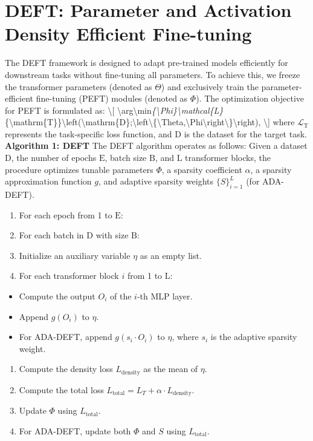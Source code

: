 \documentclass[11pt,a4paper]{article}
\begin{document}
\section{DEFT: Parameter and Activation Density Efficient Fine-tuning}

The DEFT framework is designed to adapt pre-trained models efficiently for downstream tasks without fine-tuning all parameters. To achieve this, we freeze the transformer parameters (denoted as \(\Theta\)) and exclusively train the parameter-efficient fine-tuning (PEFT) modules (denoted as \(\Phi\)). The optimization objective for PEFT is formulated as: \textbackslash{}[ \textbackslash{}arg\textbackslash{}min\textit{\{\textbackslash{}Phi\}\textbackslash{}mathcal\{L\}}\{\textbackslash{}mathrm\{T\}\}\textbackslash{}left(\textbackslash{}mathrm\{D\};\textbackslash{}left\textbackslash{}\{\textbackslash{}Theta,\textbackslash{}Phi\textbackslash{}right\textbackslash{}\}\textbackslash{}right), \textbackslash{}] where \(\mathcal{L}_{\mathrm{T}}\) represents the task-specific loss function, and \(\mathrm{D}\) is the dataset for the target task. \textbf{Algorithm 1: DEFT} The DEFT algorithm operates as follows: Given a dataset \(\mathrm{D}\), the number of epochs \(\mathrm{E}\), batch size \(\mathrm{B}\), and \(\mathrm{L}\) transformer blocks, the procedure optimizes tunable parameters \(\Phi\), a sparsity coefficient \(\alpha\), a sparsity approximation function \(g\), and adaptive sparsity weights \(\{S\}_{i=1}^{L}\) (for ADA-DEFT).
\begin{enumerate}
  \item For each epoch from 1 to \(\mathrm{E}\):
  \item For each batch in \(\mathrm{D}\) with size \(\mathrm{B}\):
  \item Initialize an auxiliary variable \(\eta\) as an empty list.
  \item For each transformer block \(i\) from 1 to \(\mathrm{L}\):
\end{enumerate}
\begin{itemize}
  \item Compute the output \(O_i\) of the \(i\)-th MLP layer.
  \item Append \(g(O_i)\) to \(\eta\).
  \item For ADA-DEFT, append \(g(s_i \cdot O_i)\) to \(\eta\), where \(s_i\) is the adaptive sparsity weight.
\end{itemize}
\begin{enumerate}
  \item Compute the density loss \(L_{\text{density}}\) as the mean of \(\eta\).
  \item Compute the total loss \(L_{\text{total}} = L_T + \alpha \cdot L_{\text{density}}\).
  \item Update \(\Phi\) using \(L_{\text{total}}\).
  \item For ADA-DEFT, update both \(\Phi\) and \(S\) using \(L_{\text{total}}\).
\end{enumerate}
\end{document}
